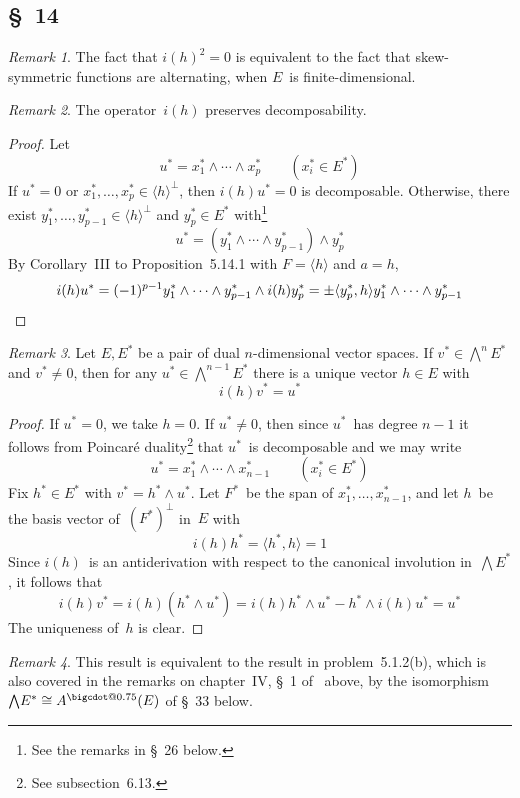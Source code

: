 \documentclass[letterpaper,12pt]{article}
\makeatletter
\newcommand{\iso}{\cong}
\newcommand{\bigcdot}[1]{\mathbin{\mathpalette\bigcdot@{#1}}}
\newcommand{\bigcdot@}[2]{%
  \sbox0{$#1\vcenter{}$}%
  \sbox2{$#1\cdot\m@th$}%
  \hbox{%
    \hfil
    \raise\ht0\hbox{%
      \scalebox{#2}{%
        \lower\ht0\hbox{$#1\bullet\m@th$}%
      }%
    }%
    \hfil
  }%
}
\newcommand{\eprod}{\wedge}
\newcommand{\bigeprod}{\bigwedge}
\newcommand{\medeprod}{{\textstyle\bigeprod}}
\newcommand{\adot}{\bigcdot{0.75}}
\newcommand{\gen}[1]{\langle#1\rangle}
\newcommand{\sprod}[2]{\langle#1,#2\rangle}
\newcommand{\oc}[1]{#1^{\perp}}
\newcommand{\multi}[4]{#2_{#3}#1\cdots#1#2_{#4}}
\newcommand{\eprods}[3]{\multi{\eprod}{#1}{#2}{#3}}
\theoremstyle{definition}
\theoremstyle{remark}
\newtheorem*{rmk}{Remark}
\makeatother
\begin{document}
\subsection*{\S~14}
\begin{rmk}
The fact that \(i(h)^2=0\) is equivalent to the fact that skew-symmetric functions are alternating, when \(E\)~is finite-dimensional.
\end{rmk}

\begin{rmk}
The operator~\(i(h)\) preserves decomposability.
\end{rmk}
\begin{proof}
Let
\[u^*=\eprods{x^*}{1}{p}\qquad(x^*_i\in E^*)\]
If \(u^*=0\) or \(x^*_1,\ldots,x^*_p\in\oc{\gen{h}}\), then \(i(h)u^*=0\) is decomposable. Otherwise, there exist \(y^*_1,\ldots,y^*_{p-1}\in\oc{\gen{h}}\) and \(y^*_p\in E^*\) with\footnote{See the remarks in \S~26 below.}
\[u^*=(\eprods{y^*}{1}{p-1})\eprod y^*_p\]
By Corollary~III to Proposition~5.14.1 with \(F=\gen{h}\) and \(a=h\),
\[i(h)u^*=(-1)^{p-1}\eprods{y^*}{1}{p-1}\eprod i(h)y^*_p=\pm\sprod{y^*_p}{h}\eprods{y^*}{1}{p-1}\qedhere\]
\end{proof}

\begin{rmk}
Let \(E,E^*\) be a pair of dual \(n\)-dimensional vector spaces. If \(v^*\in\bigeprod^n E^*\) and \(v^*\ne 0\), then for any \(u^*\in\bigeprod^{n-1}E^*\) there is a unique vector \(h\in E\) with
\[i(h)v^*=u^*\]
\end{rmk}
\begin{proof}
If \(u^*=0\), we take \(h=0\). If \(u^*\ne 0\), then since \(u^*\)~has degree \(n-1\) it follows from Poincar\'e duality\footnote{See subsection~6.13.} that \(u^*\)~is decomposable and we may write
\[u^*=\eprods{x^*}{1}{n-1}\qquad(x^*_i\in E^*)\]
Fix \(h^*\in E^*\) with \(v^*=h^*\eprod u^*\). Let \(F^*\)~be the span of \(x^*_1,\ldots,x^*_{n-1}\), and let \(h\)~be the basis vector of~\(\oc{(F^*)}\) in~\(E\) with
\[i(h)h^*=\sprod{h^*}{h}=1\]
Since \(i(h)\)~is an antiderivation with respect to the canonical involution in~\(\bigeprod E^*\), it follows that
\[i(h)v^*=i(h)(h^*\eprod u^*)=i(h)h^*\eprod u^*-h^*\eprod i(h)u^*=u^*\]
The uniqueness of~\(h\) is clear.
\end{proof}
\begin{rmk}
This result is equivalent to the result in problem~5.1.2(b), which is also covered in the remarks on chapter~IV, \S~1 of~\cite{greub1} above, by the isomorphism \(\medeprod E^*\iso A^{\adot}(E)\) of \S~33 below.
\end{rmk}
\end{document}
